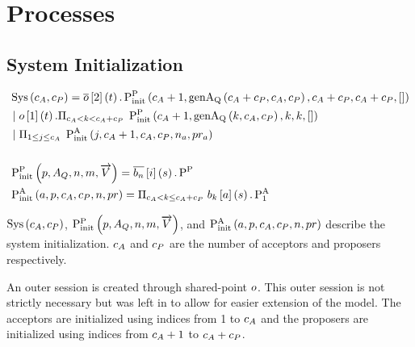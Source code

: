 \section{Processes}
\subsection{System Initialization}
\begin{align*}
&\operatorname{Sys}\left(c_A, c_P\right) = \overline{o}\left[2\right]\left(t\right) . \operatorname{P^{P}_{init}}\left(c_A + 1, \operatorname{genA_Q}\left(c_A + c_P, c_A, c_P\right), c_A + c_P, c_A + c_P, \mathtt{[]}\right)\\
&\; | \; o\left[1\right]\left(t\right) . \Pi_{c_A < k < c_A + c_P}\; \operatorname{P^{P}_{init}}\left(c_A + 1, \operatorname{genA_Q}\left(k, c_A, c_P\right), k, k, \mathtt{[]}\right) \\
&\; | \; \Pi_{1 \leq j \leq c_A}\; \operatorname{P^{A}_{init}}\left(j, c_A + 1, c_A, c_P, n_{a}, pr_{a}\right)\\
\\
&\operatorname{P^{P}_{init}}\left(p, A_Q, n, m, \overrightarrow{V}\right) = \overline{b_{n}}\left[i\right]\left(s\right) . \operatorname{P^{P}_{}}\\
&\operatorname{P^{A}_{init}}\left(a, p, c_A, c_P, n, pr\right) = \Pi_{c_A < k \le c_A + c_P}\; b_{k}\left[a\right]\left(s\right) . \operatorname{P^{A}_{1}}
\end{align*}

$\operatorname{Sys}\left(c_A, c_P\right)$, $\operatorname{P^{P}_{init}}\left(p, A_Q, n, m, \overrightarrow{V}\right)$, and $\operatorname{P^{A}_{init}}\left(a, p, c_A, c_P, n, pr\right)$ describe the system initialization.
$c_A$ and $c_P$ are the number of acceptors and proposers respectively.

An outer session is created through shared-point $o$.
This outer session is not strictly necessary but was left in to allow for easier extension of the model.
The acceptors are initialized using indices from 1 to $c_A$ and the proposers are initialized using indices from $c_A + 1$ to $c_A + c_P$.

